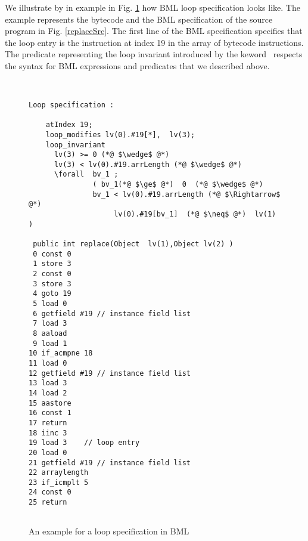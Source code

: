 We illustrate by in example in Fig. \ref{bml:loopBML} how BML loop specification looks like.
The example  represents the bytecode and the BML specification of the source program in Fig. \ref{replaceSrc}. The first line of the BML specification 
specifies that the loop entry is the instruction at index  19 in the array of bytecode instructions. The predicate
 representing  the loop invariant introduced by the keword \loopInv \ respects the syntax for BML expressions and predicates
 that we described above. 
 
\begin{figure}
\begin{lstlisting}[frame=trbl]

  
Loop specification :

    atIndex 19;
    loop_modifies lv(0).#19[*],  lv(3);
    loop_invariant
      lv(3) >= 0 (*@ $\wedge$ @*) 
      lv(3) < lv(0).#19.arrLength (*@ $\wedge$ @*)
      \forall  bv_1 ; 
               ( bv_1(*@ $\ge$ @*)  0  (*@ $\wedge$ @*) 
               bv_1 < lv(0).#19.arrLength (*@ $\Rightarrow$ @*) 
                    lv(0).#19[bv_1]  (*@ $\neq$ @*)  lv(1) )

 public int replace(Object  lv(1),Object lv(2) )
 0 const 0
 1 store 3
 2 const 0
 3 store 3
 4 goto 19
 5 load 0
 6 getfield #19 // instance field list
 7 load 3
 8 aaload
 9 load 1
10 if_acmpne 18 
11 load 0
12 getfield #19 // instance field list
13 load 3
14 load 2
15 aastore
16 const 1
17 return
18 iinc 3  
19 load 3    // loop entry 
20 load 0
21 getfield #19 // instance field list 
22 arraylength
23 if_icmplt 5
24 const 0
25 return
 
\end{lstlisting}
\caption{\sc An example for a loop specification in BML} \label{bml:loopBML}\end{figure}




